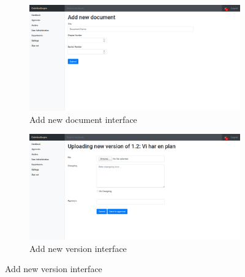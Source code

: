 \begin{figure}[H]
	\centering
	\begin{subfigure}[b]{0.48\textwidth}
		\includegraphics[width=\textwidth]{billeder/iteration2Prototyper/AddDoc.png}
		\caption{Add new document interface}
		\label{fig:4-AddDoc}
	\end{subfigure}
	\quad
	\begin{subfigure}[b]{0.48\textwidth}
		\includegraphics[width=\textwidth]{billeder/iteration2Prototyper/AddVer.png}
		\caption{Add new version interface}
		\label{fig:4-AddVer}
	\end{subfigure}
\end{figure}
